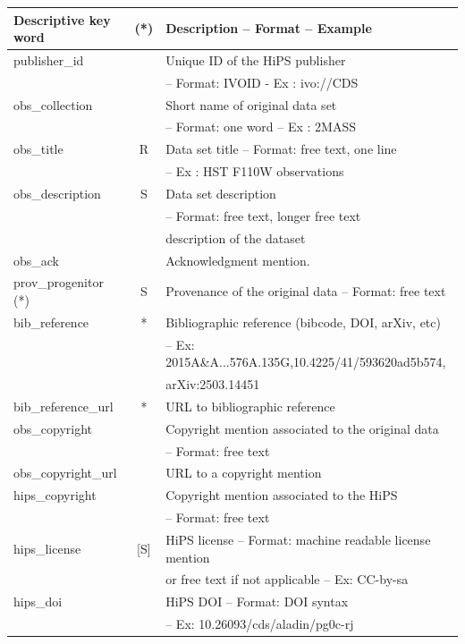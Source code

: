 \documentclass[11pt,a4paper]{ivoa}
\begin{document}
\begin{longtable}{|l|c|l|}
\hline
{\bf Descriptive key word} & (*)  & {\bf Description – Format – Example}  \\ \hline
\endfirsthead

publisher\_id &   & Unique ID of the HiPS publisher\\ & & – Format: IVOID - Ex : ivo://CDS \\ \hline
obs\_collection &   & Short name of original data set\\ & & – Format: one word – Ex : 2MASS \\ \hline
obs\_title & R & Data set title – Format: free text, one line\\ & & – Ex : HST F110W observations \\ \hline
obs\_description & S & Data set description\\ & & – Format: free text, longer free text\\ & & description of the dataset \\ \hline
obs\_ack &   & Acknowledgment mention. \\ \hline
prov\_progenitor (*) & S & Provenance of the original data – Format: free text \\ \hline
bib\_reference & * & Bibliographic reference (bibcode, DOI, arXiv, etc)\\ & &   – Ex: 2015A\&A...576A.135G,10.4225/41/593620ad5b574,\\ & &   arXiv:2503.14451\\ \hline
bib\_reference\_url & *  & URL to bibliographic reference \\ \hline
obs\_copyright &   & Copyright mention associated to the original data\\ & & – Format: free text \\ \hline
obs\_copyright\_url &   & URL to a copyright mention \\ \hline
hips\_copyright &  & Copyright mention associated to the HiPS\\ & & – Format: free text \\ \hline
hips\_license & [S] & HiPS license – Format: machine readable license mention\\ 
 & &  or free text if not applicable – Ex: CC-by-sa\\ \hline
hips\_doi &   & HiPS DOI – Format: DOI syntax\\ 
 & &   – Ex: 10.26093/cds/aladin/pg0c-rj\\ \hline

\end{longtable}
\end{document}

